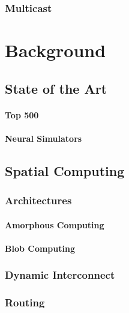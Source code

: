 \documentclass[a4paper,12pt,titlepage]{report}
\begin{document}
			\subsection{Multicast}
	
	
	
	\chapter{Background}
		\label{chap:background}
		
		\section{State of the Art}
		
			\subsubsection{Top 500}
			
			\subsubsection{Neural Simulators}
			
			\section{Spatial Computing}
				
				\subsection{Architectures}
					
					\subsubsection{Amorphous Computing}
					
					\subsubsection{Blob Computing}
				
				\subsection{Dynamic Interconnect}
				
				\subsection{Routing}
		
\end{document}
